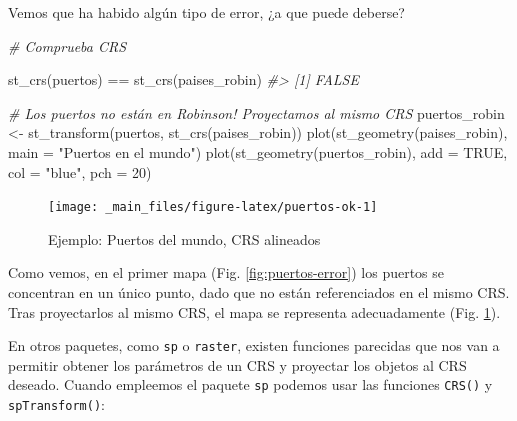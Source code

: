 \documentclass[
]{report}
\newenvironment{Shaded}{\begin{snugshade}}{\end{snugshade}}
\newcommand{\AttributeTok}[1]{\textcolor[rgb]{0.77,0.63,0.00}{#1}}
\newcommand{\CommentTok}[1]{\textcolor[rgb]{0.56,0.35,0.01}{\textit{#1}}}
\newcommand{\ConstantTok}[1]{\textcolor[rgb]{0.00,0.00,0.00}{#1}}
\newcommand{\DecValTok}[1]{\textcolor[rgb]{0.00,0.00,0.81}{#1}}
\newcommand{\FunctionTok}[1]{\textcolor[rgb]{0.00,0.00,0.00}{#1}}
\newcommand{\NormalTok}[1]{#1}
\newcommand{\OtherTok}[1]{\textcolor[rgb]{0.56,0.35,0.01}{#1}}
\newcommand{\SpecialCharTok}[1]{\textcolor[rgb]{0.00,0.00,0.00}{#1}}
\newcommand{\StringTok}[1]{\textcolor[rgb]{0.31,0.60,0.02}{#1}}
\begin{document}
Vemos que ha habido algún tipo de error, ¿a que puede deberse?

\begin{Shaded}
\begin{Highlighting}[]
\CommentTok{\# Comprueba CRS}

\FunctionTok{st\_crs}\NormalTok{(puertos) }\SpecialCharTok{==} \FunctionTok{st\_crs}\NormalTok{(paises\_robin)}
\CommentTok{\#\textgreater{} [1] FALSE}

\CommentTok{\# Los puertos no están en Robinson! Proyectamos al mismo CRS}
\NormalTok{puertos\_robin }\OtherTok{\textless{}{-}} \FunctionTok{st\_transform}\NormalTok{(puertos, }\FunctionTok{st\_crs}\NormalTok{(paises\_robin))}
\FunctionTok{plot}\NormalTok{(}\FunctionTok{st\_geometry}\NormalTok{(paises\_robin), }\AttributeTok{main =} \StringTok{"Puertos en el mundo"}\NormalTok{)}
\FunctionTok{plot}\NormalTok{(}\FunctionTok{st\_geometry}\NormalTok{(puertos\_robin), }\AttributeTok{add =} \ConstantTok{TRUE}\NormalTok{, }\AttributeTok{col =} \StringTok{"blue"}\NormalTok{, }\AttributeTok{pch =} \DecValTok{20}\NormalTok{)}
\end{Highlighting}
\end{Shaded}

\begin{figure}

{\centering \texttt{[image: \_main\_files/figure-latex/puertos-ok-1]} 

}

\caption{Ejemplo: Puertos del mundo, CRS alineados}\label{fig:puertos-ok}
\end{figure}

Como vemos, en el primer mapa (Fig. \ref{fig:puertos-error}) los puertos se
concentran en un único punto, dado que no están referenciados en el mismo CRS.
Tras proyectarlos al mismo CRS, el mapa se representa adecuadamente (Fig.
\ref{fig:puertos-ok}).

En otros paquetes, como \texttt{sp} o \texttt{raster}, existen funciones parecidas que nos van
a permitir obtener los parámetros de un CRS y proyectar los objetos al CRS
deseado. Cuando empleemos el paquete \texttt{sp} podemos usar las funciones \texttt{CRS()} y
\texttt{spTransform()}:

\begin{Shaded}
\end{Shaded}
\end{document}
